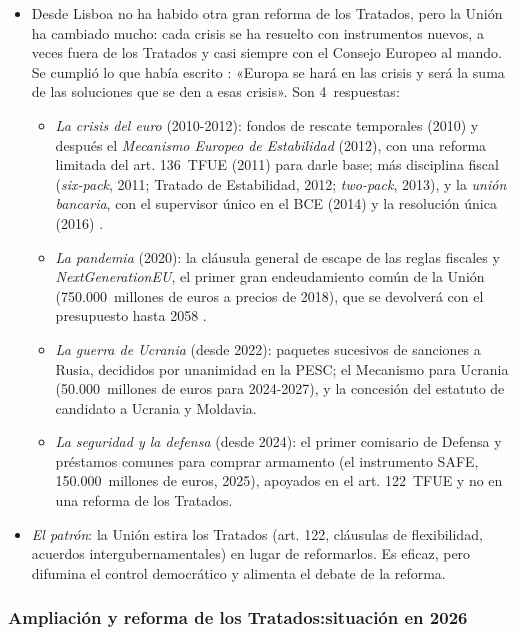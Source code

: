 \documentclass[11pt]{article}
\begin{document}
\begin{itemize}
\item Desde Lisboa no ha habido otra gran reforma de los Tratados, pero la Unión ha cambiado mucho: cada crisis se ha resuelto con instrumentos nuevos, a veces fuera de los Tratados y casi siempre con el Consejo Europeo al mando. Se cumplió lo que había escrito : «Europa se hará en las crisis y será la suma de las soluciones que se den a esas crisis». Son 4~respuestas:
  \begin{itemize}
  \item \emph{La crisis del euro} (2010-2012): fondos de rescate temporales (2010) y después el \emph{Mecanismo Europeo de Estabilidad} (2012), con una reforma limitada del art. 136~TFUE (2011) para darle base; más disciplina fiscal (\emph{six-pack}, 2011; Tratado de Estabilidad, 2012; \emph{two-pack}, 2013), y la \emph{unión bancaria}, con el supervisor único en el BCE (2014) y la resolución única (2016)  .
  \item \emph{La pandemia} (2020): la cláusula general de escape de las reglas fiscales y \emph{NextGenerationEU}, el primer gran endeudamiento común de la Unión (750.000~millones de euros a precios de 2018), que se devolverá con el presupuesto hasta 2058\nocite{UE2020EURI} .
  \item \emph{La guerra de Ucrania} (desde 2022): paquetes sucesivos de sanciones a Rusia, decididos por unanimidad en la PESC; el Mecanismo para Ucrania (50.000~millones de euros para 2024-2027)\nocite{UE2024Ucrania}, y la concesión del estatuto de candidato a Ucrania y Moldavia.
  \item \emph{La seguridad y la defensa} (desde 2024): el primer comisario de Defensa y préstamos comunes para comprar armamento (el instrumento SAFE, 150.000~millones de euros, 2025)\nocite{UE2025SAFE}, apoyados en el art. 122~TFUE y no en una reforma de los Tratados.
  \end{itemize}
\item \emph{El patrón}: la Unión estira los Tratados (art. 122, cláusulas de flexibilidad, acuerdos intergubernamentales) en lugar de reformarlos. Es eficaz, pero difumina el control democrático y alimenta el debate de la reforma.
\end{itemize}

\subsubsection{Ampliación y reforma de los Tratados:\cortetitulo situación en 2026}\label{sec:ampliacion}
\end{document}
